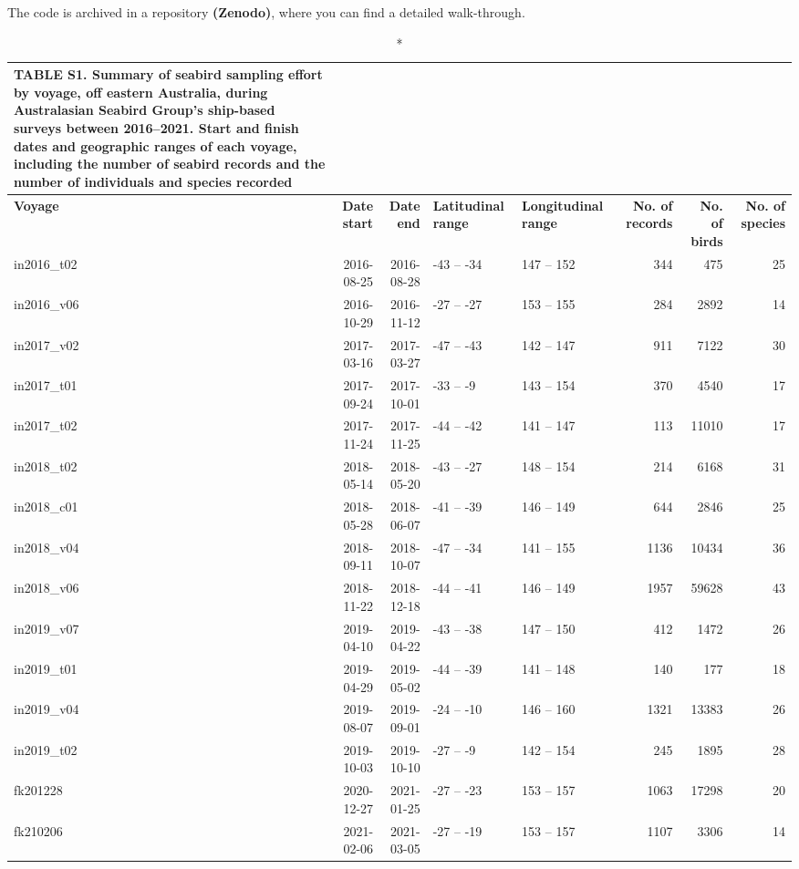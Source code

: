 \documentclass[
]{article}
\begin{document}
The code is archived in a repository \textbf{(Zenodo)}, where you can
find a detailed walk-through.

\newpage

\begin{landscape}

\begin{longtable}{lrrllrrr}
\caption*{
{\large \textbf{TABLE S1.} Summary of seabird sampling effort by voyage, off eastern Australia, during Australasian Seabird Group's ship-based surveys between 2016--2021. Start and finish dates and geographic ranges of each voyage, including the number of seabird records and the number of individuals and species recorded}
} \\ 
\toprule
\textbf{Voyage} & \textbf{Date start} & \textbf{Date end} & \textbf{Latitudinal range} & \textbf{Longitudinal range} & \textbf{No. of records} & \textbf{No. of birds} & \textbf{No. of species} \\ 
\midrule
in2016\_t02 & 2016-08-25 & 2016-08-28 & -43 – -34 & 147 – 152 & 344 & 475 & 25 \\ 
in2016\_v06 & 2016-10-29 & 2016-11-12 & -27 – -27 & 153 – 155 & 284 & 2892 & 14 \\ 
in2017\_v02 & 2017-03-16 & 2017-03-27 & -47 – -43 & 142 – 147 & 911 & 7122 & 30 \\ 
in2017\_t01 & 2017-09-24 & 2017-10-01 & -33 – -9 & 143 – 154 & 370 & 4540 & 17 \\ 
in2017\_t02 & 2017-11-24 & 2017-11-25 & -44 – -42 & 141 – 147 & 113 & 11010 & 17 \\ 
in2018\_t02 & 2018-05-14 & 2018-05-20 & -43 – -27 & 148 – 154 & 214 & 6168 & 31 \\ 
in2018\_c01 & 2018-05-28 & 2018-06-07 & -41 – -39 & 146 – 149 & 644 & 2846 & 25 \\ 
in2018\_v04 & 2018-09-11 & 2018-10-07 & -47 – -34 & 141 – 155 & 1136 & 10434 & 36 \\ 
in2018\_v06 & 2018-11-22 & 2018-12-18 & -44 – -41 & 146 – 149 & 1957 & 59628 & 43 \\ 
in2019\_v07 & 2019-04-10 & 2019-04-22 & -43 – -38 & 147 – 150 & 412 & 1472 & 26 \\ 
in2019\_t01 & 2019-04-29 & 2019-05-02 & -44 – -39 & 141 – 148 & 140 & 177 & 18 \\ 
in2019\_v04 & 2019-08-07 & 2019-09-01 & -24 – -10 & 146 – 160 & 1321 & 13383 & 26 \\ 
in2019\_t02 & 2019-10-03 & 2019-10-10 & -27 – -9 & 142 – 154 & 245 & 1895 & 28 \\ 
fk201228 & 2020-12-27 & 2021-01-25 & -27 – -23 & 153 – 157 & 1063 & 17298 & 20 \\ 
fk210206 & 2021-02-06 & 2021-03-05 & -27 – -19 & 153 – 157 & 1107 & 3306 & 14 \\ 
\bottomrule
\end{longtable}


\end{landscape}
\end{document}
